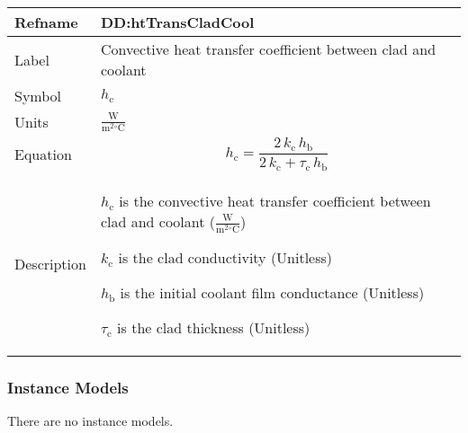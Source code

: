 \documentclass[12pt]{article}
\begin{document}
\medskip
\noindent
\begin{minipage}{\textwidth}
\begin{tabular}{>{\raggedright}p{}>{\raggedright\arraybackslash}p{}}
\toprule \textbf{Refname} & \textbf{DD:htTransCladCool}
\label{DD:htTransCladCool}
\\ \midrule
Label & Convective heat transfer coefficient between clad and coolant
        
\\ \midrule
Symbol & ${h_{\text{c}}}$
         
\\ \midrule
Units & $\frac{\text{W}}{\text{m}^{2}{}^{\circ}\text{C}}$
        
\\ \midrule
Equation & \begin{displaymath}
           {h_{\text{c}}}=\frac{2\,{k_{\text{c}}}\,{h_{\text{b}}}}{2\,{k_{\text{c}}}+{τ_{\text{c}}}\,{h_{\text{b}}}}
           \end{displaymath}
\\ \midrule
Description & \begin{symbDescription}
              \item{${h_{\text{c}}}$ is the convective heat transfer coefficient between clad and coolant ($\frac{\text{W}}{\text{m}^{2}{}^{\circ}\text{C}}$)}
              \item{${k_{\text{c}}}$ is the clad conductivity (Unitless)}
              \item{${h_{\text{b}}}$ is the initial coolant film conductance (Unitless)}
              \item{${τ_{\text{c}}}$ is the clad thickness (Unitless)}
              \end{symbDescription}
\\ \bottomrule
\end{tabular}
\end{minipage}

\subsubsection{Instance Models}
\label{Sec:IMs}
There are no instance models.
\end{document}
